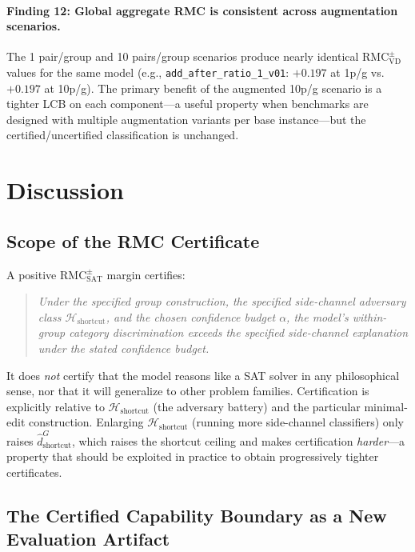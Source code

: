 \documentclass[conference]{IEEEtran}
\theoremstyle{remark}
\newcommand{\RMCSAT}{\mathrm{RMC}_{\mathrm{SAT}}}
\newcommand{\RMCVD}{\mathrm{RMC}_{\mathrm{VD}}}
\newcommand{\hatshortcutDisc}{\hat d_{\mathrm{shortcut}}^{G}}
\newcommand{\shortcutHypCls}{\mathcal{H}_{\mathrm{shortcut}}}
\begin{document}
\paragraph{Finding 12: Global aggregate RMC is consistent across augmentation scenarios.}
The 1 pair/group and 10 pairs/group scenarios produce nearly identical $\RMCVD^{\pm}$ values for the same model (e.g., \texttt{add\_after\_ratio\_1\_v01}: $+0.197$ at 1p/g vs.\ $+0.197$ at 10p/g).
The primary benefit of the augmented 10p/g scenario is a tighter LCB on each component---a useful property when benchmarks are designed with multiple augmentation variants per base instance---but the certified/uncertified classification is unchanged.

\section{Discussion}
\label{sec:discussion}

\subsection{Scope of the RMC Certificate}

A positive $\RMCSAT^{\pm}$ margin certifies:

\begin{quote}
\emph{Under the specified group construction, the specified side-channel adversary class $\shortcutHypCls$, and the chosen confidence budget $\alpha$, the model's within-group category discrimination exceeds the specified side-channel explanation under the stated confidence budget.}
\end{quote}

It does \emph{not} certify that the model reasons like a SAT solver in any philosophical sense, nor that it will generalize to other problem families.
Certification is explicitly relative to $\shortcutHypCls$ (the adversary battery) and the particular minimal-edit construction.
Enlarging $\shortcutHypCls$ (running more side-channel classifiers) only raises $\hatshortcutDisc$, which raises the shortcut ceiling and makes certification \emph{harder}---a property that should be exploited in practice to obtain progressively tighter certificates.

\subsection{The Certified Capability Boundary as a New Evaluation Artifact}
\end{document}
